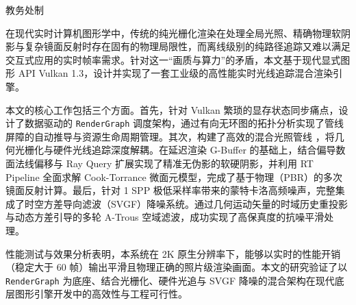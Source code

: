   \vfill

  \begin{flushright}
    { 教务处制}
  \end{flushright}
\egroup
\clearpage

\begin{cnabstract}
\thispagestyle{empty}

在现代实时计算机图形学中，传统的纯光栅化渲染在处理全局光照、精确物理软阴影与复杂镜面反射时存在固有的物理局限性，而离线级别的纯路径追踪又难以满足交互式应用的实时帧率需求。针对这一“画质与算力”的矛盾，本文基于现代显式图形 API Vulkan 1.3，设计并实现了一套工业级的高性能实时光线追踪混合渲染引擎。

本文的核心工作包括三个方面。首先，针对 Vulkan 繁琐的显存状态同步痛点，设计了数据驱动的 \texttt{RenderGraph} 调度架构，通过有向无环图的拓扑分析实现了管线屏障的自动推导与资源生命周期管理。其次，构建了高效的混合光照管线
，将几何光栅化与硬件光线追踪深度解耦。在延迟渲染 G-Buffer 的基础上，结合偏导数面法线偏移与 Ray Query 扩展实现了精准无伪影的软硬阴影，并利用 RT Pipeline 全面求解 Cook-Torrance 微面元模型，完成了基于物理（PBR）的多次镜面反射计算。最后，针对 1 SPP 极低采样率带来的蒙特卡洛高频噪声，完整集成了时空方差导向滤波（SVGF）降噪系统。通过几何运动矢量的时域历史重投影与动态方差引导的多轮 A-Trous 空域滤波，成功实现了高保真度的抗噪平滑处理。

性能测试与效果分析表明，本系统在 2K 原生分辨率下，能够以实时的性能开销（稳定大于 60 帧）输出平滑且物理正确的照片级渲染画面。本文的研究验证了以 \texttt{RenderGraph} 为底座、结合光栅化、硬件光追与 SVGF 降噪的混合架构在现代底层图形引擎开发中的高效性与工程可行性。

\end{cnabstract}
\par
\vspace*{2em}



